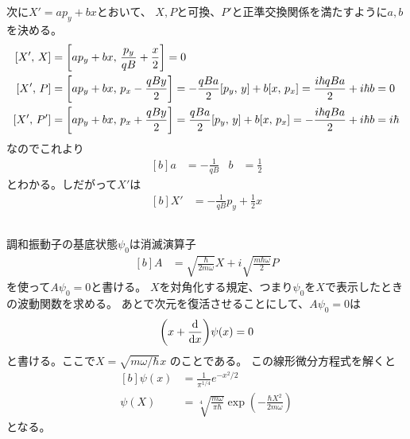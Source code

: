 \documentclass[../../master.tex]{subfiles}
\begin{document}
次に\(X' = ap_y+bx\)とおいて、
\(X,P\)と可換、\(P'\)と正準交換関係を満たすように\(a,b\)を決める。
\begin{equation}\begin{aligned}[b]
    [X',\,X] &= \qty[ap_y+bx,\,\frac{p_y}{qB}+\frac{x}{2}]
    =0\\
    [X',\,P] &= \qty[ap_y+bx,\,p_x-\frac{qBy}{2}] = -\frac{qBa}{2}[p_y,\,y]+b[x,\,p_x] = \frac{i\hbar qBa}{2} + i\hbar b  = 0\\
    [X',\,P'] &= \qty[ap_y+bx,\,p_x+\frac{qBy}{2}] = \frac{qBa}{2}[p_y,\,y]+b[x,\,p_x] = - \frac{i\hbar qBa}{2} + i\hbar b = i\hbar\\
\end{aligned}\end{equation}
なのでこれより
\begin{equation}\begin{aligned}[b]
    a &=  -\frac{1}{qB} & b&= \frac{1}{2}
\end{aligned}\end{equation}
とわかる。しだがって\(X'\)は
\begin{equation}\begin{aligned}[b]
    X' &= -\frac{1}{qB}p_y + \frac{1}{2}x
\end{aligned}\end{equation}

\subsection{}
調和振動子の基底状態\(\psi_0\)は消滅演算子
\begin{equation}\begin{aligned}[b]
    A &= \sqrt{\frac{\hbar}{2m\omega}}X + i\sqrt{\frac{m\hbar\omega}{2}}P
\end{aligned}\end{equation}
を使って\(A\psi_0 = 0\)と書ける。
\(X\)を対角化する規定、つまり\(\psi_0\)を\(X\)で表示したときの波動関数を求める。
あとで次元を復活させることにして、\(A\psi_0 = 0\)は
\begin{equation}\begin{aligned}[b]
    \qty(x+\dv{x})\psi(x) = 0
\end{aligned}\end{equation}
と書ける。ここで\(X = \sqrt{m\omega/\hbar} x\) のことである。
この線形微分方程式を解くと
\begin{equation}\begin{aligned}[b]
    \psi(x) &= \frac{1}{\pi^{1/4}}e^{-x^2/2}\\
    \psi(X) &= \sqrt[4]{\frac{m\omega}{\pi \hbar}} \exp(-\frac{\hbar X^2}{2m\omega})
\end{aligned}\end{equation}
となる。
\end{document}
